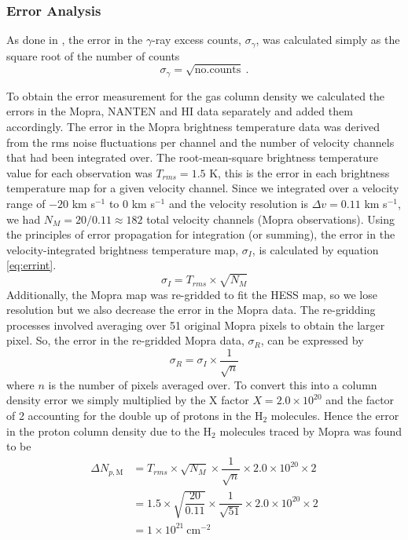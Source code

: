 \documentclass[12pt,a4paper]{article}
\begin{document}
\subsubsection{Error Analysis}
As done in \cite{2012ApJ...746...82F}, the error in the $\gamma$-ray excess counts, $\sigma_{\gamma}$, was calculated simply as the square root of the number of counts
\begin{equation}
\label{eq:errgamma}
\sigma_{\gamma} = \sqrt{\mathrm{no. counts}} \ .
\end{equation}

To obtain the error measurement for the gas column density we calculated the errors in the Mopra, NANTEN and HI data separately and added them accordingly. 
The error in the Mopra brightness temperature data was derived from the rms noise fluctuations per channel and the number of velocity channels that had been integrated over. 
The root-mean-square brightness temperature value for each observation was $T_{rms} = 1.5$ K, this is the error in each brightness temperature map for a given velocity channel. 
Since we integrated over a velocity range of $-20$ km s$^{-1}$ to 0 km s$^{-1}$ and the velocity resolution is $\Delta v = 0.11 $ km s$^{-1}$, we had $N_M = 20 / 0.11 \approx 182 $ total velocity channels (Mopra observations). 
Using the principles of error propagation for integration (or summing), the error in the velocity-integrated brightness temperature map, $\sigma_I$, is calculated by equation \ref{eq:errint}.
\begin{equation}
\label{eq:errint}
\sigma_I = T_{rms} \times \sqrt{N_M}
\end{equation}
Additionally, the Mopra map was re-gridded to fit the HESS map, so we lose resolution but we also decrease the error in the Mopra data. 
The re-gridding processes involved averaging over 51 original Mopra pixels to obtain the larger pixel.
So, the error in the re-gridded Mopra data, $\sigma_R$, can be expressed by
\begin{equation}
\label{eq:errregrid}
\sigma_R = \sigma_I \times \dfrac{1}{\sqrt{n}}
\end{equation}
where $n$ is the number of pixels averaged over. 
To convert this into a column density error we simply multiplied by the X factor $X = 2.0 \times 10^{20}$ and the factor of 2 accounting for the double up of protons in the H$_2$ molecules. 
Hence the error in the proton column density due to the H$_2$ molecules traced by Mopra was found to be
\begin{equation*}
\begin{split}
\Delta N_{p,\mathrm{M}} &= T_{rms} \times \sqrt{N_M} \times \dfrac{1}{\sqrt{n}} \times 2.0 \times 10^{20} \times 2 \\
&= 1.5 \times \sqrt{\dfrac{20}{0.11}} \times \dfrac{1}{\sqrt{51}} \times 2.0 \times 10^{20} \times 2 \\
&= 1 \times 10^{21} \ \mathrm{cm}^{-2}
\end{split}
\end{equation*}
\end{document}
